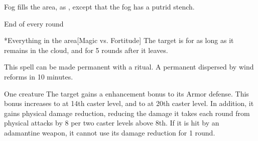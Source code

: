\begin{spellheader}
    \spelldur{\durshort}
\end{spellheader}
\begin{spelleffects}
    \spelleffect Fog fills the area, as , except that the fog has a putrid stench.
    \begin{spelltrigger}{End of every round}
        \begin{spelltarget}*{Everything in the area}[Magic vs. Fortitude]
            \spellsuccess The target is \sickened for as long as it remains in the cloud, and for 5 rounds after it leaves.
        \end{spelltarget}
    \end{spelltrigger}
\end{spelleffects}
\begin{spellfooter}
    \spellnotes This spell can be made permanent with a  ritual. A permanent  dispersed by wind reforms in 10 minutes. \fogspellnotes \fogwindspellnotes
\end{spellfooter}

\begin{spellheader}
    \spelldur{\durshort}
\end{spellheader}
\begin{spelleffects}
    \begin{spelltarget}{One creature}
        \spelleffect The target gains a  enhancement bonus to its Armor defense. This bonus increases to  at 14th caster level, and to  at 20th caster level. In addition, it gains physical damage reduction, reducing the damage it takes each round from physical attacks by 8  per two caster levels above 8th. If it is hit by an adamantine weapon, it cannot use its damage reduction for 1 round.
    \end{spelltarget}
\end{spelleffects}

